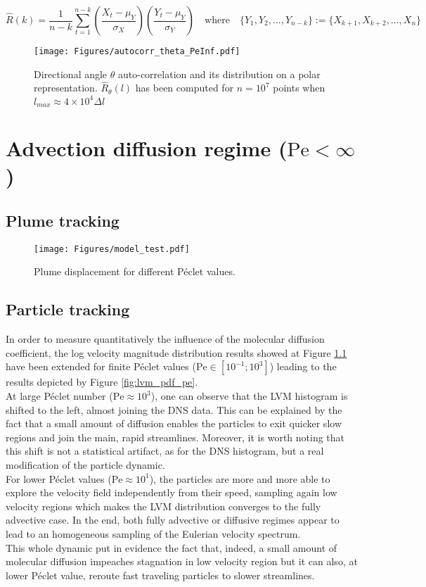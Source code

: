 \begin{equation}
\hat R(k) = \frac{1}{n-k} \sum_{t=1}^{n-k} \left(\frac{X_t-\mu_Y}{\sigma_X}\right)\left(\frac{Y_t-\mu_Y}{\sigma_Y}\right) \quad\textrm{where}\quad \{Y_1,Y_2,...,Y_{n-k}\} := \{X_{k+1},X_{k+2},...,X_{n}\} 
\label{eq:autocorr}
\end{equation}

\begin{figure}
	\centering
	\texttt{[image: Figures/autocorr\_theta\_PeInf.pdf]}
	\caption{Directional angle $\theta$ auto-correlation and its distribution on a polar representation. $\hat{R}_\theta(l)$ has been computed for $n=10^7$ points when $l_{max}\approx 4\times10^4 \Delta l$}
	\label{fig:autocorrt_peinf}
\end{figure}

\chapter{Advection diffusion regime ($\mathrm{Pe}<\infty$)}

\section{Plume tracking}
\begin{figure}[h!]
	\centering
	\texttt{[image: Figures/model\_test.pdf]}
	\caption{Plume displacement for different Péclet values.}
	\label{fig:lvm_pdf_peinf}
\end{figure}

\section{Particle tracking}
In order to measure quantitatively the influence of the molecular diffusion coefficient, the log velocity magnitude distribution results showed at Figure \ref{fig:lvm_pdf_peinf} have been extended for finite Péclet values ($\mathrm{Pe}\in[10^{-1};10^3]$) leading to the results depicted by Figure \ref{fig:lvm_pdf_pe}.\\
At large Péclet number ($\mathrm{Pe}\approx 10^3$), one can observe that the LVM histogram is shifted to the left, almost joining the DNS data. 
This can be explained by the fact that a small amount of diffusion enables the particles to exit quicker slow regions and join the main, rapid streamlines.
Moreover, it is worth noting that this shift is not a statistical artifact, as for the DNS histogram, but a real modification of the particle dynamic.\\
For lower Péclet values ($\mathrm{Pe}\approx10^1$), the particles are more and more able to explore the velocity field independently from their speed, sampling again low velocity regions which makes the LVM distribution converges to the fully advective case.
In the end, both fully advective or diffusive regimes appear to lead to an homogeneous sampling of the Eulerian velocity spectrum.\\
This whole dynamic put in evidence the fact that, indeed, a small amount of molecular diffusion impeaches stagnation in low velocity region but it can also, at lower Péclet value, reroute fast traveling particles to slower streamlines.

